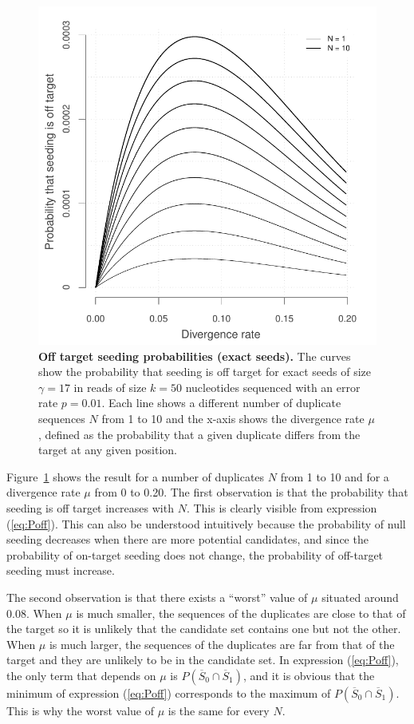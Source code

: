 \documentclass{article}
\begin{document}
\begin{figure}[h]
\centering
\includegraphics[scale=0.65]{curves_exact.pdf}
\caption{\textbf{Off target seeding probabilities (exact seeds).}
The curves show the probability that seeding is off target for exact seeds
of size $\gamma=17$ in reads of size $k=50$ nucleotides sequenced with an
error rate $p=0.01$. Each line shows a different number of duplicate
sequences $N$ from 1 to 10 and the x-axis shows the divergence rate $\mu$,
defined as the probability that a given duplicate differs from the target
at any given position.}
\label{fig:curves_exact}
\end{figure}

Figure~\ref{fig:curves_exact} shows the result for a number of duplicates
$N$ from 1 to 10 and for a divergence rate $\mu$ from 0 to 0.20. The first
observation is that the probability that seeding is off target increases
with $N$. This is clearly visible from expression (\ref{eq:Poff}). This
can also be understood intuitively because the probability of null seeding
decreases when there are more potential candidates, and since the
probability of on-target seeding does not change, the probability of
off-target seeding must increase.

The second observation is that there exists a ``worst'' value of $\mu$
situated around 0.08. When $\mu$ is much smaller, the sequences of the
duplicates are close to that of the target so it is unlikely that the
candidate set contains one but not the other. When $\mu$ is much larger,
the sequences of the duplicates are far from that of the target and they
are unlikely to be in the candidate set. In expression (\ref{eq:Poff}),
the only term that depends on $\mu$ is $P(\overline{S}_0 \cap
\overline{S}_1)$, and it is obvious that the minimum of expression
(\ref{eq:Poff}) corresponds to the maximum of $P(\overline{S}_0 \cap
\overline{S}_1)$. This is why the worst value of $\mu$ is the same for
every $N$.
\end{document}
